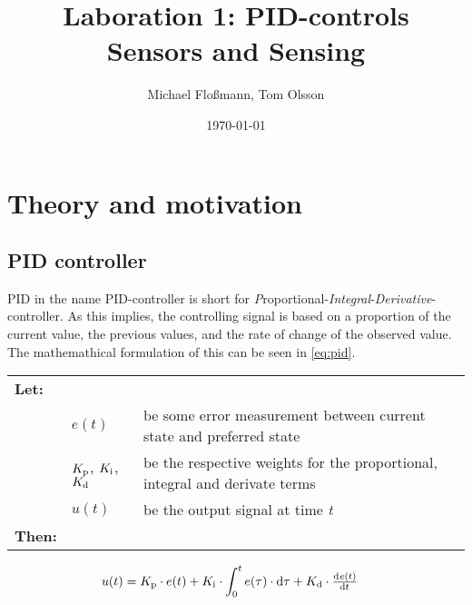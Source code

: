 \documentclass[11pt]{article}
\title{Laboration 1: PID-controls\\ {\small Sensors and Sensing}}
\author{Michael Flo{\ss}mann, Tom Olsson}
\date{\today}
\begin{document}
\maketitle %
\listoffigures %
\lstlistoflistings %
\lstset{ matchrangestart=t} %
\section{Theory and motivation}
\subsection{PID controller}
PID in the name PID-controller is short for \emph{P}roportional-\emph{Integral}-\emph{Derivative}-controller. As this implies, the controlling signal is based on a proportion of the current value, the previous values, and the rate of change of the observed value. The mathemathical formulation of this can be seen in \vref{eq:pid}.\par \vspace{10pt}
{\footnotesize
  \begin{tabular}{l l l}
    \textbf{Let:} \\
 &$e(t)$ &be some error measurement between current state and preferred state\\
 &$K_\textup{p}$, $K_\textup{i}$, $K_\textup{d}$ &be the respective weights for the proportional, integral and derivate terms \\
 &$u(t)$ &be the output signal at time \emph{t} \\
    \textbf{Then:}
  \end{tabular}
  \begin{align}
    u(t) &= \di{K}{p}\cdot e(t) + \di{K}{i} \cdot\int_{0}^{t}e(\tau)\cdot \dif\tau + \di{K}{d} \cdot \od{e(t)}{t}\label{eq:pid}
  \end{align}}
\par
\end{document}
